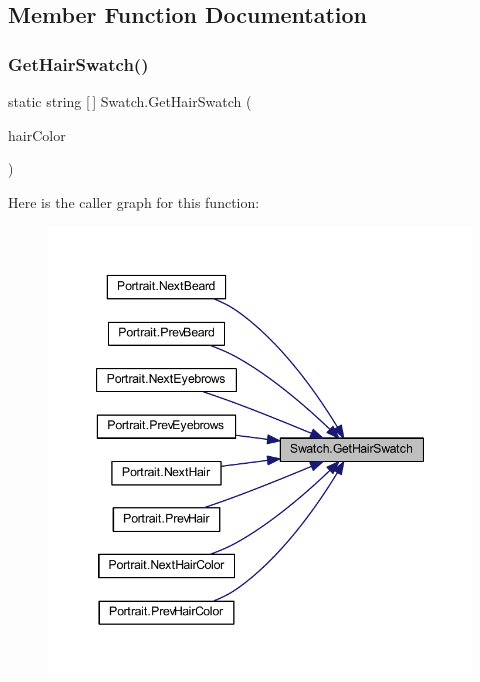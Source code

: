 \subsection{Member Function Documentation}
\mbox{\label{class_swatch_ad9aee8913b15b1cd21e4d734aeb00f6b}} 
\subsubsection{\texorpdfstring{GetHairSwatch()}{GetHairSwatch()}}
{\footnotesize\ttfamily static string \mbox{[}$\,$\mbox{]} Swatch.\+Get\+Hair\+Swatch (\begin{DoxyParamCaption}\item[{\mbox{\hyperlink{class_character_a7940fffce9bfadb9e7abf15490cf8bb0}{Character.\+Hair\+Color}}}]{hair\+Color }\end{DoxyParamCaption})\hspace{0.3cm}{\ttfamily [static]}}

Here is the caller graph for this function\+:\nopagebreak
\begin{figure}[H]
\begin{center}
\leavevmode
\includegraphics[width=347pt]{class_swatch_ad9aee8913b15b1cd21e4d734aeb00f6b_icgraph}
\end{center}
\end{figure}
\mbox{\label{class_swatch_aad8681cfc4c7902a684220e08e67b00b}} 
